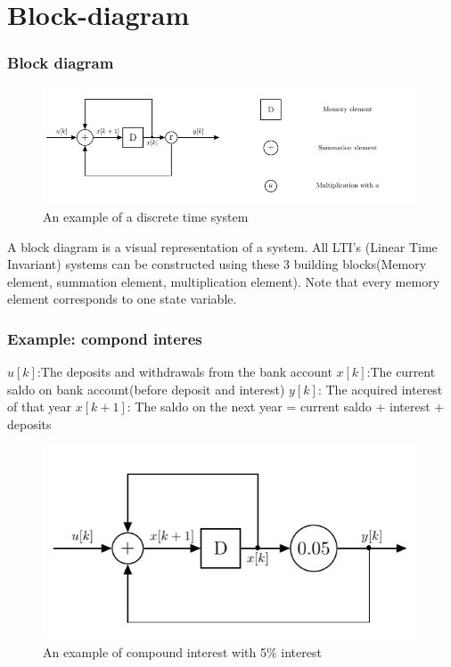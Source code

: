 \section{Block-diagram}
\begin{frame}
\frametitle{Block diagram}
\begin{figure}
\centering
\label{fig:discrete_time_systems_2}
\includegraphics[width=0.8\linewidth]{Images/discrete_time_systems_2}
\caption{An example of a discrete time system}
\end{figure}
A block diagram is a visual representation of a system. All LTI’s (Linear Time Invariant) systems can be constructed using these 3 building blocks(Memory element, summation element, multiplication element). Note that every memory element corresponds to one state variable.
\end{frame}
\begin{frame}
	\frametitle{Example: compond interes}
	$ u[k]$:The deposits and withdrawals from the bank account
	$ x[k]$:The current saldo on bank account(before deposit and interest)
	$ y[k]$: The acquired interest of that year
	$ x[k+1]$: The saldo on the next year = current saldo + interest + deposits
	\begin{figure}
\centering
\includegraphics{Images/discrete_time_systems_3}
\caption{An example of compound interest with 5\% interest}
\label{fig:discrete_time_systems_3}
\end{figure}
\end{frame}
